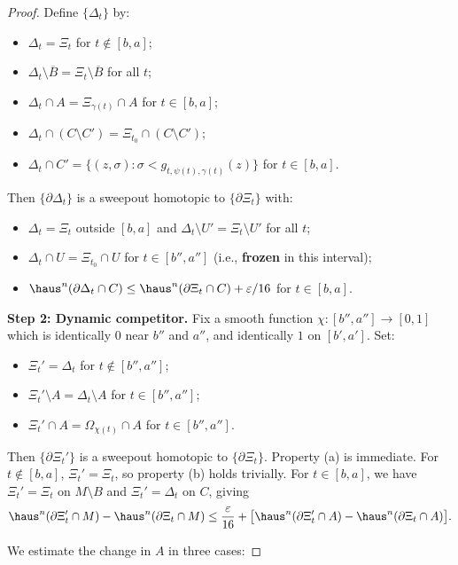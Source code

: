\begin{proof}
Define $\{\Delta_t\}$ by:
\begin{itemize}
    \item $\Delta_t=\Xi_t$ for $t\notin[b,a]$;
    \item $\Delta_t\setminus\overline B=\Xi_t\setminus\overline B$ for all $t$;
    \item $\Delta_t\cap A=\Xi_{\gamma(t)}\cap A$ for $t\in[b,a]$;
    \item $\Delta_t\cap(C\setminus C')=\Xi_{t_0}\cap(C\setminus C')$;
    \item $\Delta_t\cap C'=\{(z,\sigma):\sigma<g_{t,\psi(t),\gamma(t)}(z)\}$ for $t\in[b,a]$.
\end{itemize}
Then $\{\partial\Delta_t\}$ is a sweepout homotopic to $\{\partial\Xi_t\}$ with:
\begin{itemize}
    \item $\Delta_t=\Xi_t$ outside $[b,a]$ and $\Delta_t\setminus U'=\Xi_t\setminus U'$ for all $t$;
    \item $\Delta_t\cap U=\Xi_{t_0}\cap U$ for $t\in[b'',a'']$ (i.e., \textbf{frozen} in this interval);
    \item $\haus^n(\partial\Delta_t\cap C)\le \haus^n(\partial\Xi_t\cap C)+\varepsilon/16$ for $t\in[b,a]$.
\end{itemize}

\noindent\textbf{Step 2: Dynamic competitor.}
Fix a smooth function $\chi:[b'',a'']\to[0,1]$ which is identically $0$ near $b''$ and $a''$, and identically $1$ on $[b',a']$. Set:
\begin{itemize}
    \item $\Xi_t'=\Delta_t$ for $t\notin[b'',a'']$;
    \item $\Xi_t'\setminus A=\Delta_t\setminus A$ for $t\in[b'',a'']$;
    \item $\Xi_t'\cap A=\Omega_{\chi(t)}\cap A$ for $t\in[b'',a'']$.
\end{itemize}
Then $\{\partial\Xi_t'\}$ is a sweepout homotopic to $\{\partial\Xi_t\}$. Property (a) is immediate. For $t\notin[b,a]$, $\Xi_t'=\Xi_t$, so property (b) holds trivially. For $t\in[b,a]$, we have $\Xi_t'=\Xi_t$ on $M\setminus B$ and $\Xi_t'=\Delta_t$ on $C$, giving
\begin{equation}\label{eq:freeze-area-estimate}
\haus^n(\partial\Xi_t'\cap M)-\haus^n(\partial\Xi_t\cap M)
\le \frac{\varepsilon}{16}+\bigl[\haus^n(\partial\Xi_t'\cap A)-\haus^n(\partial\Xi_t\cap A)\bigr].
\end{equation}

We estimate the change in $A$ in three cases:


\end{proof}
